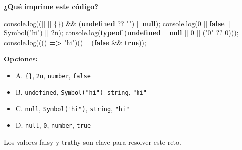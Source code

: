 \documentclass[
  letterpaper,
  DIV=11,
  numbers=noendperiod]{scrreprt}
\newenvironment{Shaded}{\begin{snugshade}}{\end{snugshade}}
\newcommand{\BuiltInTok}[1]{\textcolor[rgb]{0.00,0.23,0.31}{#1}}
\newcommand{\DecValTok}[1]{\textcolor[rgb]{0.68,0.00,0.00}{#1}}
\newcommand{\FunctionTok}[1]{\textcolor[rgb]{0.28,0.35,0.67}{#1}}
\newcommand{\KeywordTok}[1]{\textcolor[rgb]{0.00,0.23,0.31}{\textbf{#1}}}
\newcommand{\NormalTok}[1]{\textcolor[rgb]{0.00,0.23,0.31}{#1}}
\newcommand{\OperatorTok}[1]{\textcolor[rgb]{0.37,0.37,0.37}{#1}}
\newcommand{\StringTok}[1]{\textcolor[rgb]{0.13,0.47,0.30}{#1}}
\providecommand{\tightlist}{%
  \setlength{\itemsep}{0pt}\setlength{\parskip}{0pt}}
\begin{document}
\textbf{¿Qué imprime este código?}

\begin{Shaded}
\begin{Highlighting}[]
\BuiltInTok{console}\OperatorTok{.}\FunctionTok{log}\NormalTok{(([] }\OperatorTok{||}\NormalTok{ \{\}) }\OperatorTok{\&\&}\NormalTok{ (}\KeywordTok{undefined} \OperatorTok{??} \StringTok{""}\NormalTok{) }\OperatorTok{||} \KeywordTok{null}\NormalTok{)}\OperatorTok{;}
\BuiltInTok{console}\OperatorTok{.}\FunctionTok{log}\NormalTok{(}\DecValTok{0} \OperatorTok{||} \KeywordTok{false} \OperatorTok{||} \BuiltInTok{Symbol}\NormalTok{(}\StringTok{"hi"}\NormalTok{) }\OperatorTok{||} \DecValTok{2}\NormalTok{n)}\OperatorTok{;}
\BuiltInTok{console}\OperatorTok{.}\FunctionTok{log}\NormalTok{(}\KeywordTok{typeof}\NormalTok{ (}\KeywordTok{undefined} \OperatorTok{||} \KeywordTok{null} \OperatorTok{||} \DecValTok{0} \OperatorTok{||}\NormalTok{ (}\StringTok{"0"} \OperatorTok{??} \DecValTok{0}\NormalTok{)))}\OperatorTok{;}
\BuiltInTok{console}\OperatorTok{.}\FunctionTok{log}\NormalTok{((() }\KeywordTok{=\textgreater{}} \StringTok{"hi"}\NormalTok{)() }\OperatorTok{||}\NormalTok{ (}\KeywordTok{false} \OperatorTok{\&\&} \KeywordTok{true}\NormalTok{))}\OperatorTok{;}
\end{Highlighting}
\end{Shaded}

\textbf{Opciones:}

\begin{itemize}
\tightlist
\item
  A. \texttt{\{\}}, \texttt{2n}, \texttt{number}, \texttt{false}
\item
  B. \texttt{undefined}, \texttt{Symbol("hi")}, \texttt{string},
  \texttt{"hi"}
\item
  C. \texttt{null}, \texttt{Symbol("hi")}, \texttt{string},
  \texttt{"hi"}
\item
  D. \texttt{null}, \texttt{0}, \texttt{number}, \texttt{true}
\end{itemize}

\begin{tcolorbox}[enhanced jigsaw, left=2mm, toprule=.15mm, leftrule=.75mm, breakable, colback=white, coltitle=black, bottomtitle=1mm, arc=.35mm, rightrule=.15mm, colframe=quarto-callout-tip-color-frame, opacitybacktitle=0.6, toptitle=1mm, opacityback=0, titlerule=0mm, title=\textcolor{quarto-callout-tip-color}{\faLightbulb}\hspace{0.5em}{Pista}, bottomrule=.15mm, colbacktitle=quarto-callout-tip-color!10!white]

Los valores falsy y truthy son clave para resolver este reto.

\end{tcolorbox}
\end{document}
